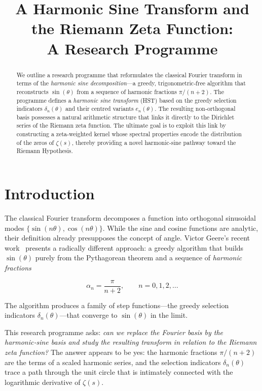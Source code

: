 \documentclass[11pt,a4paper]{article}
\title{A Harmonic Sine Transform and the Riemann Zeta Function:\\
A Research Programme}
\author{}
\date{}
\begin{document}
\maketitle

\begin{abstract}
We outline a research programme that reformulates the classical Fourier transform in terms of the \emph{harmonic sine decomposition}—a greedy, trigonometric‑free algorithm that reconstructs $\sin(\theta)$ from a sequence of harmonic fractions $\pi/(n+2)$. The programme defines a \emph{harmonic sine transform} (HST) based on the greedy selection indicators $\delta_n(\theta)$ and their centred variants $e_n(\theta)$. The resulting non‑orthogonal basis possesses a natural arithmetic structure that links it directly to the Dirichlet series of the Riemann zeta function. The ultimate goal is to exploit this link by constructing a zeta‑weighted kernel whose spectral properties encode the distribution of the zeros of $\zeta(s)$, thereby providing a novel harmonic‑sine pathway toward the Riemann Hypothesis.
\end{abstract}

\section{Introduction}
The classical Fourier transform decomposes a function into orthogonal sinusoidal modes $\{ \sin(n\theta), \cos(n\theta) \}$. While the sine and cosine functions are analytic, their definition already presupposes the concept of angle. Victor Geere’s recent work~\cite{Geere2026a,Geere2026b} presents a radically different approach: a greedy algorithm that builds $\sin(\theta)$ purely from the Pythagorean theorem and a sequence of \emph{harmonic fractions}

\[
\alpha_n = \frac{\pi}{n+2}, \qquad n = 0,1,2,\dots
\]

The algorithm produces a family of step functions—the greedy selection indicators $\delta_n(\theta)$—that converge to $\sin(\theta)$ in the limit.

This research programme asks: \emph{can we replace the Fourier basis by the harmonic‑sine basis and study the resulting transform in relation to the Riemann zeta function?} The answer appears to be yes: the harmonic fractions $\pi/(n+2)$ are the terms of a scaled harmonic series, and the selection indicators $\delta_n(\theta)$ trace a path through the unit circle that is intimately connected with the logarithmic derivative of $\zeta(s)$.
\end{document}
